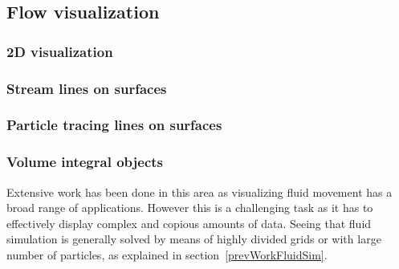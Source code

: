 \documentclass[11pt]{report}
\begin{document}
\subsection{Flow visualization}


\subsubsection{2D visualization}

\subsubsection{Stream lines on surfaces}

\subsubsection{Particle tracing lines on surfaces}

\subsubsection{Volume integral objects}

Extensive work has been done in this area as visualizing fluid movement has a broad range of applications.
However this is a challenging task as it has to effectively display complex and copious amounts of data.
Seeing that fluid simulation is generally solved by means of highly divided grids or with large number of particles, as explained in section~\ref{prevWorkFluidSim}.\\
\end{document}
